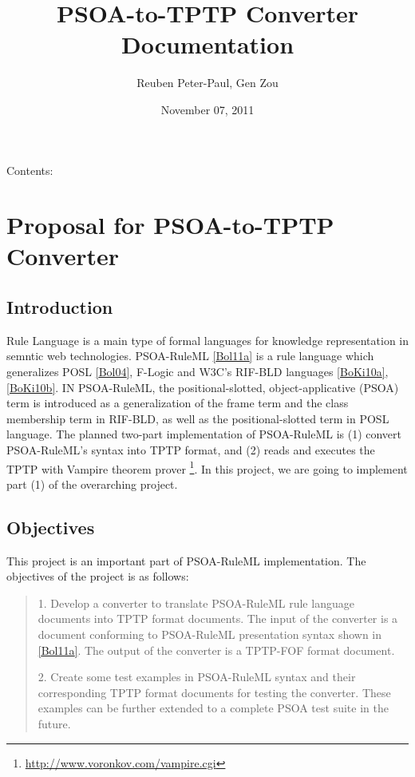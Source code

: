 \documentclass[letterpaper,10pt,english]{sphinxmanual}
\title{PSOA-to-TPTP Converter Documentation}
\date{November 07, 2011}
\author{Reuben Peter-Paul, Gen Zou}
\begin{document}
\maketitle
\tableofcontents
{}\label{main::doc}


Contents:


\chapter{Proposal for PSOA-to-TPTP Converter}
\label{project-proposal/index::doc}\label{project-proposal/index:welcome-to-psoa-to-tptp-converter-s-documentation}\label{project-proposal/index:proposal-for-psoa-to-tptp-converter}

\section{Introduction}
\label{project-proposal/index:introduction}
Rule Language is a main type of formal languages for knowledge representation in
semntic web technologies.  PSOA-RuleML {\hyperref[project-proposal/index:bol11a]{{[}Bol11a{]}}} is a rule language which
generalizes POSL {\hyperref[project-proposal/index:bol04]{{[}Bol04{]}}}, F-Logic and W3C's RIF-BLD languages
{\hyperref[project-proposal/index:boki10a]{{[}BoKi10a{]}}}, {\hyperref[project-proposal/index:boki10b]{{[}BoKi10b{]}}}.  IN PSOA-RuleML, the positional-slotted,
object-applicative (PSOA) term is introduced as a generalization of the frame
term and the class membership term in RIF-BLD, as well as the positional-slotted
term in POSL language.  The planned two-part implementation of PSOA-RuleML is
(1) convert PSOA-RuleML's syntax into TPTP format, and (2) reads and executes
the TPTP with Vampire theorem prover \footnote{
\href{http://www.voronkov.com/vampire.cgi}{http://www.voronkov.com/vampire.cgi}
}.  In this project, we are going to
implement part (1) of the overarching project.


\section{Objectives}
\label{project-proposal/index:objectives}
This project is an important part of PSOA-RuleML implementation.  The objectives
of the project is as follows:
\begin{quote}

1. Develop a converter to translate PSOA-RuleML rule language documents into TPTP
format documents.  The input of the converter is a document conforming to
PSOA-RuleML presentation syntax shown in {\hyperref[project-proposal/index:bol11a]{{[}Bol11a{]}}}.  The output of the
converter is a TPTP-FOF format document.

2. Create some test examples in PSOA-RuleML syntax and their corresponding TPTP
format documents for testing the converter.  These examples can be further
extended to a complete PSOA test suite in the future.
\end{quote}
\end{document}
